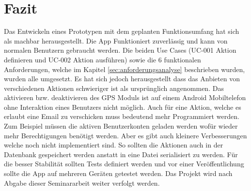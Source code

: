 \chapter{Fazit}
\label{sec:fazit}
Das Entwickeln eines Prototypen mit dem geplanten Funktionsumfang hat sich als machbar herausgestellt. Die App Funktioniert zuverlässig und kann von normalen Benutzern gebraucht werden. Die beiden Use Cases (UC-001 Aktion definieren und UC-002 Aktion ausführen) sowie die 6 funktionalen Anforderungen, welche im Kapitel \ref{sec:anforderungsanalyse} beschrieben wurden, wurden alle umgesetzt. \newline{} Es hat sich jedoch herausgestellt dass das Anbieten von verschiedenen Aktionen schwieriger ist als ursprünglich angenommen. Das aktivieren bzw. deaktivieren des GPS Moduls ist auf einem Android Mobiltelefon ohne Interaktion eines Benutzers nicht möglich. Auch für eine Aktion, welche es erlaubt eine Email zu verschicken muss bedeutend mehr Programmiert werden. Zum Beispiel müssen die aktiven Benutzerkonten geladen werden wofür wieder mehr Berechtigungen benötigt werden. Aber es gibt auch kleinere Verbesserungen welche noch nicht implementiert sind. So sollten die Aktionen auch in der Datenbank gespeichert werden anstatt in eine Datei serialisiert zu werden. Für die besser Stabilität sollten Tests definiert werden und vor einer Veröffentlichung sollte die App auf mehreren Geräten getestet werden. Das Projekt wird nach Abgabe dieser Seminararbeit weiter verfolgt werden.